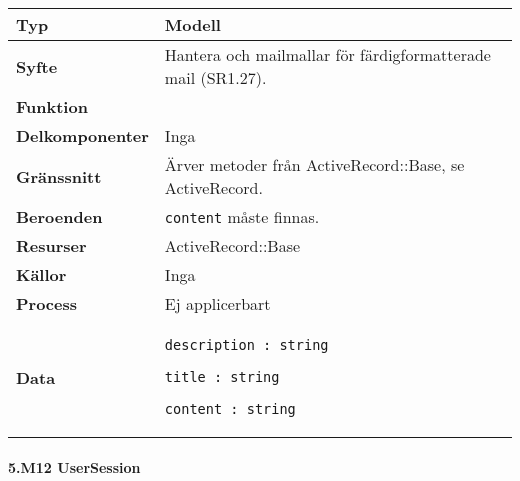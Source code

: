 \documentclass[a4paper, twoside, 11pt, titlepage]{article}
\begin{document}
			\begin {table} [ht] \begin{tabular} {  p{3.5cm} p{11.6cm} }
				\hline
				{\sffamily\textbf{Typ}} & {Modell} \\
				\hline
				{\sffamily\textbf{Syfte}} & {Hantera och mailmallar för färdigformatterade mail (SR1.27).} \\
				\hline
				{\sffamily\textbf{Funktion}} & { } \\
				\hline
				{\sffamily\textbf{Delkomponenter}} & {Inga} \\
				\hline
				{\sffamily\textbf{Gränssnitt}} & {Ärver metoder från ActiveRecord::Base, se ActiveRecord.} \\
				\hline
				{\sffamily\textbf{Beroenden}} & {{\tt content} måste finnas.} \\
				\hline
				{\sffamily\textbf{Resurser}} & {ActiveRecord::Base} \\
				\hline
				{\sffamily\textbf{Källor}} & {Inga} \\
				\hline
				{\sffamily\textbf{Process}} & {Ej applicerbart} \\
				\hline
				{\sffamily\textbf{Data}} & {{\tt description : string}

{\tt title : string}

{\tt content : string}} \\
				\hline
			\end{tabular} \end{table} \FloatBarrier


			\clearpage %
			\paragraph{5.M12 UserSession}\
\end{document}
